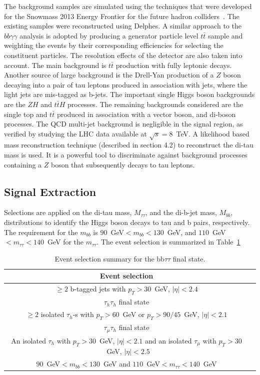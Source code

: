 The background samples are simulated using the techniques that were developed for the Snowmass 2013 Energy Frontier for the future hadron colliders~\cite{Avetisyan}. The existing samples were reconstructed using Delphes. A similar approach to the $bb\gamma\gamma$ analysis is adopted by producing a generator particle level $t\bar{t}$ sample and weighting the events by their corresponding efficiencies for selecting the constituent particles. The resolution effects of the detector are also taken into account. The main background is $t\bar{t}$ production with fully leptonic decays. Another source of large background is the Drell-Yan
production of a $Z$ boson decaying into a pair of tau leptons
produced in association with jets, where the light jets are mis-tagged as b-jets. The important single Higgs boson backgrounds are the $ZH$ and  $t\bar{t}H$ processes. The remaining backgrounds considered are the single top and $t\bar{t}$ produced in association with a vector boson, and di-boson processes.
The QCD multi-jet background is negligible in the signal region, as verified by studying the LHC data available at $\sqrt{s} = 8$~TeV. A likelihood based mass reconstruction technique (described in section 4.2) to reconstruct the di-tau mass is used. It is a powerful tool to discriminate against background processes containing a $Z$ boson that subsequently decays to tau leptons. 

\subsection {Signal Extraction}
 Selections are applied on the di-tau mass, $M_{\tau\tau}$, and the di-b-jet mass, $M_{bb}$, distributions to identify
the Higgs boson decays to tau and b pairs, respectively. The requirement for the $m_{bb}$ is $90$~GeV$<m_{bb}<130$~GeV, and
$110$~GeV$<m_{\tau\tau}<140$~GeV for the $m_{\tau\tau}$. The event selection is summarized in Table~\ref{tab:event_selection} 

\begin{table}[!ht]
\begin{center} 
\begin{tabular}{|c|c|}
\hline
Event selection                                    \\ \hline
$\geq 2$ b-tagged jets with $p_{T}>30$~GeV, $|\eta|<2.4$ \\ \hline
$\tau_{h}\tau_{h}$ final state                     \\ 
$\geq 2$ isolated $\tau_{h}$-s with $p_{T}>60$~GeV or $p_{T}>90/45$~GeV, $|\eta|<2.1$  \\ \hline
$\tau_{\mu}\tau_{h}$ final state                     \\ 
An isolated $\tau_{h}$ with $p_{T}>30$~GeV, $|\eta|<2.1$ and an isolated $\tau_{\mu}$ with  $p_{T}>30$~GeV, $|\eta|<2.5$ \\ \hline 
 $90$~GeV$<m_{bb}<130$~GeV and $110$~GeV$<m_{\tau\tau}<140$~GeV \\ \hline
\end{tabular}
\caption{ Event selection summary for the bb$\tau\tau$ final state.}
\label{tab:event_selection}
\end{center}
\end{table}


